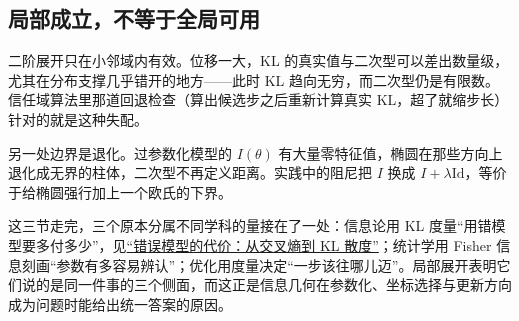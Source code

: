 \subsection{局部成立，不等于全局可用}

二阶展开只在小邻域内有效。位移一大，KL 的真实值与二次型可以差出数量级，尤其在分布支撑几乎错开的地方——此时 KL 趋向无穷，而二次型仍是有限数。信任域算法里那道回退检查（算出候选步之后重新计算真实 KL，超了就缩步长）针对的就是这种失配。

另一处边界是退化。过参数化模型的 \(I(\theta)\) 有大量零特征值，椭圆在那些方向上退化成无界的柱体，二次型不再定义距离。实践中的阻尼把 \(I\) 换成 \(I+\lambda\mathrm{Id}\)，等价于给椭圆强行加上一个欧氏的下界。

这三节走完，三个原本分属不同学科的量接在了一处：信息论用 KL 度量``用错模型要多付多少''，见\hyperref[sec:07-Information-Theory/03-Divergences/01]{``错误模型的代价：从交叉熵到 KL 散度''}；统计学用 Fisher 信息刻画``参数有多容易辨认''；优化用度量决定``一步该往哪儿迈''。局部展开表明它们说的是同一件事的三个侧面，而这正是信息几何在参数化、坐标选择与更新方向成为问题时能给出统一答案的原因。
